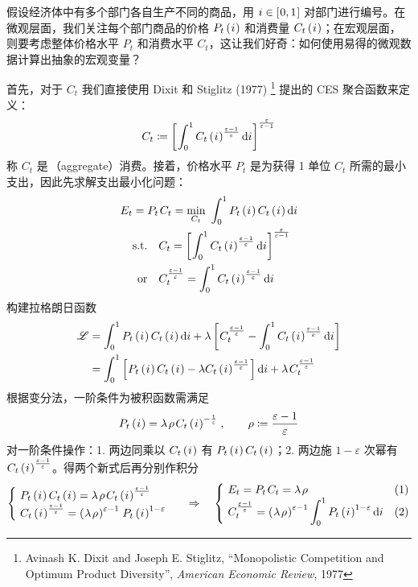 假设经济体中有多个部门各自生产不同的商品，用 \(i\in\left[\mspace{1mu}0,1\mspace{1mu}\right]\) 对部门进行编号。在微观层面，我们关注每个部门商品的价格 \(P_t\left(\mspace{1mu} i\mspace{1mu}\right)\) 和消费量 \(C_t\left(\mspace{1mu} i\mspace{1mu}\right)\)；在宏观层面，则要考虑整体价格水平 \(P_t\) 和消费水平 \(C_t\)，这让我们好奇：如何使用易得的微观数据计算出抽象的宏观变量？

首先，对于 \(C_t\) 我们直接使用 Dixit 和 Stiglitz (1977) \footnote{Avinash K. Dixit and Joseph E. Stiglitz, ``Monopolistic Competition and Optimum Product Diversity'', \emph{American Economic Review}, 1977} 提出的 CES 聚合函数来定义：
\begin{equation*}
    C_t\coloneq\left[\mspace{1mu}\int^1_0 C_t\left(\mspace{1mu} i\mspace{1mu}\right)^{\frac{\varepsilon-1}\varepsilon}\mathrm{d}i\mspace{1mu}\right]^{\frac\varepsilon{\varepsilon-1}}
\end{equation*}
称 \(C_t\) 是\,（aggregate）消费。接着，价格水平 \(P_t\) 是为获得 1 单位 \(C_t\) 所需的最小支出，因此先求解支出最小化问题：
\begin{align*}
    E_t =\;&P_t\,C_t= \min_{C_t} \ \int^1_0 P_t\bki C_t\bki \mathrm{d}i \\
    \text{s.t.} &\quad C_t=\bks{\int^1_0 C_t\bki^{\frac{\varepsilon-1}\varepsilon}\mathrm{d}i}^{\frac\varepsilon{\varepsilon-1}} \\
    \text{or} & \quad C_t^{\frac{\varepsilon-1}{\varepsilon}}=\int^1_0 C_t\bki^{\frac{\varepsilon-1}\varepsilon}\mathrm{d}i
\end{align*}
构建拉格朗日函数
\begin{align*}
    \scr L &=\int^1_0 P_t\bki C_t\bki\mathrm di+\lambda\bks{C_t^{\frac{\varepsilon-1}\varepsilon}-\int^1_0C_t\bki ^{\frac{\varepsilon-1}\varepsilon}\mathrm di}\\
    &= \int^1_0 \bks{P_t\bki C_t\bki-\lambda C_t\bki ^{\frac{\varepsilon-1}\varepsilon}}\mathrm di+\lambda\,C_t^{\frac{\varepsilon-1}\varepsilon}
\end{align*}
根据变分法，一阶条件为被积函数需满足
\begin{align*}
    P_t\bki=\lambda\,\rho\, C_t\bki ^{-\frac1\varepsilon}\,,\qquad \rho\coloneq\dfrac{\varepsilon-1}\varepsilon
\end{align*}
对一阶条件操作：1. 两边同乘以 \(C_t\left(\mspace{1mu} i\mspace{1mu}\right)\) 有 \(P_t\left(\mspace{1mu} i\mspace{1mu}\right) C_t\left(\mspace{1mu} i\mspace{1mu}\right)\)；2. 两边施 \(1-\varepsilon\) 次幂有 \(C_t\left(\mspace{1mu} i\mspace{1mu}\right)^{\frac{\varepsilon-1}\varepsilon}\)。得两个新式后再分别作积分
\begin{equation*}
    \begin{cases}
        \ P_t\bki C_t\bki=\lambda\,\rho\, C_t\bki ^{\frac{\varepsilon-1}\varepsilon}\\
        \ C_t\bki^{\frac{\varepsilon-1}\varepsilon}=\bka{\lambda\,\rho}^{\varepsilon-1}\,P_t\bki^{1-\varepsilon}
    \end{cases} \ \ \Rightarrow\quad
    \begin{cases}
        \ E_t=P_t\,C_t=\lambda\,\rho & (1)\\
        \ \dis C_t^{\frac{\varepsilon-1}\varepsilon}=\bka{\lambda\,\rho}^{\varepsilon-1}\int^1_0 P_t\bki^{1-\varepsilon}\mathrm di & (2)
    \end{cases}
\end{equation*}
